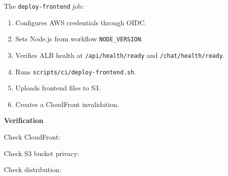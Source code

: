 The \texttt{deploy-\allowbreak{}frontend} job:

\begin{enumerate}
\def\labelenumi{\arabic{enumi}.}
\tightlist
\item
  Configures AWS credentials through OIDC.
\item
  Sets Node.js from workflow \texttt{NODE\_\allowbreak{}VERSION}.
\item
  Verifies ALB health at \texttt{/\allowbreak{}api/\allowbreak{}health/\allowbreak{}ready} and
  \texttt{/\allowbreak{}chat/\allowbreak{}health/\allowbreak{}ready}.
\item
  Runs \texttt{scripts/\allowbreak{}ci/\allowbreak{}deploy-\allowbreak{}frontend.\allowbreak{}sh}.
\item
  Uploads frontend files to S3.
\item
  Creates a CloudFront invalidation.
\end{enumerate}

\vspace{0.5em}\noindent\textbf{Verification}\par

Check CloudFront:

\begin{Shaded}
\begin{Highlighting}[]
 
 
 
\end{Highlighting}
\end{Shaded}

Check S3 bucket privacy:

\begin{Shaded}
\begin{Highlighting}[]
\DataTypeTok{\textbackslash{}}
  \OperatorTok{\textless{}}\OperatorTok{\textgreater{}}
\end{Highlighting}
\end{Shaded}

Check distribution:

\begin{Shaded}
\begin{Highlighting}[]
\end{Highlighting}
\end{Shaded}

